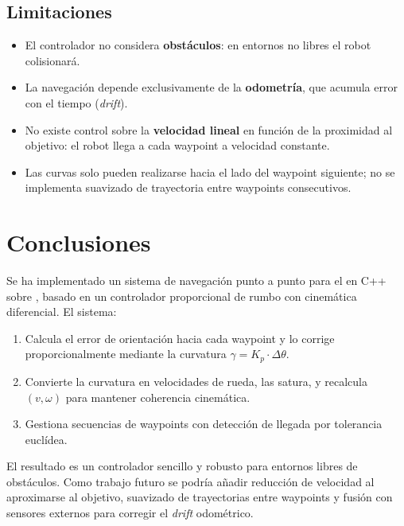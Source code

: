 \documentclass[12pt]{article}
\begin{document}
\subsection{Limitaciones}
\begin{itemize}[leftmargin=2em]
  \item El controlador no considera \textbf{obst\'{a}culos}: en entornos no libres el robot colisionar\'{a}.
  \item La navegaci\'{o}n depende exclusivamente de la \textbf{odometr\'{i}a}, que acumula error con el tiempo (\emph{drift}).
  \item No existe control sobre la \textbf{velocidad lineal} en funci\'{o}n de la proximidad al objetivo: el robot llega a cada waypoint a velocidad constante.
  \item Las curvas solo pueden realizarse hacia el lado del waypoint siguiente; no se implementa suavizado de trayectoria entre waypoints consecutivos.
\end{itemize}


\section{Conclusiones}
Se ha implementado un sistema de navegaci\'{o}n punto a punto para el \pioneer{} en C++ sobre \ros{}, basado en un controlador proporcional de rumbo con cinem\'{a}tica diferencial. El sistema:

\begin{enumerate}[leftmargin=2em]
  \item Calcula el error de orientaci\'{o}n hacia cada waypoint y lo corrige proporcionalmente mediante la curvatura $\gamma = K_p \cdot \Delta\theta$.
  \item Convierte la curvatura en velocidades de rueda, las satura, y recalcula $(v, \omega)$ para mantener coherencia cinem\'{a}tica.
  \item Gestiona secuencias de waypoints con detecci\'{o}n de llegada por tolerancia eucl\'{i}dea.
\end{enumerate}

El resultado es un controlador sencillo y robusto para entornos libres de obst\'{a}culos. Como trabajo futuro se podr\'{i}a a\~{n}adir reducci\'{o}n de velocidad al aproximarse al objetivo, suavizado de trayectorias entre waypoints y fusi\'{o}n con sensores externos para corregir el \emph{drift} odom\'{e}trico.
\end{document}
